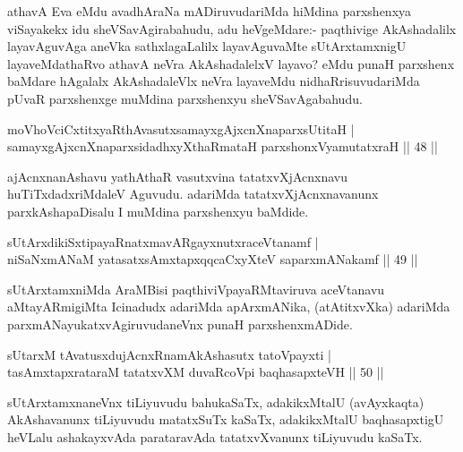 \begin{artha}%
athavA Eva eMdu avadhAraNa mADiruvudariMda hiMdina parxshenxya viSayakekx idu sheVSavAgirabahudu, adu heVgeMdare:- paqthivige AkAshadalilx layavAgu\-vAga aneVka sathxlagaLalilx layavAguvaMte sUtArxtamxnigU layaveMdathaRvo athavA neVra AkAshadalelxV layavo? eMdu punaH parxshenx baMdare hAgalalx AkAshadaleVlx neVra layaveMdu nidhaRrisuvudariMda pUvaR parxshenxge muMdina parxshenxyu sheVSavAga\-bahudu.
\end{artha}

\begin{shl}
moVhoVciCxtitxyaRthAvasutxsamayxgAjxcnXnaparxsUtitaH |\\
samayxgAjxcnXnaparxsidadhxyXthaRmataH parxshonxV\s yamutatxraH \hfill || 48 ||
\end{shl}

\begin{artha}
ajAcnxnanAshavu yathAthaR vasutxvina tatatxvXjAcnxnavu huTiTxdadxriMdaleV Aguvudu. adariMda tatatxvXjAcnxnavanunx parxkAshapaDisalu I muMdina parxshenxyu baMdide.
\end{artha}

\begin{shl}
sUtArxdikiSxtipayaRnatxmavARgayxnutxraceVtanamf |\\
\footnotemark[1]niSaNxmANaM yatasatxsAmxtapxqqcaCxyXteV \footnotemark[2]saparxmANakamf \hfill || 49 ||
\end{shl}

\begin{artha}
sUtArxtamxniMda AraMBisi paqthiviVpayaRMtaviruva aceVtanavu aMtayARmi\-giMta Icinadudx adariMda apArxmANika, (atAtitxvXka) adariMda parxmANayukatx\-vAgiruvudaneVnx punaH parxshenxmADide.
\end{artha}


\begin{shl}
sUtarxM tAvatusxdujAcnxRnamAkAshasutx tatoV\s payxti |\\
tasAmxtapxrataraM tatatxvXM duvaRcoV\s pi baqhasapxteVH \hfill || 50 ||
\end{shl}

\begin{artha}
sUtArxtamxnaneVnx tiLiyuvudu bahukaSaTx, adakikxMtalU (avAyxkaqta) AkAshavanunx tiLiyuvudu matatxSuTx kaSaTx, adakikxMtalU baqhasapxtigU heVLalu ashakayxvAda parataravAda tatatxvXvanunx tiLiyuvudu kaSaTx.
\end{artha}


